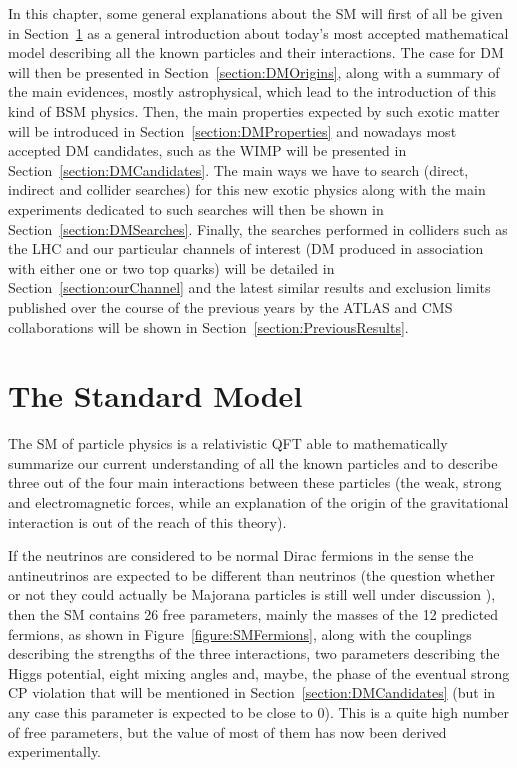 \documentclass[a4paper, 10pt, openright]{report}
\begin{document}
In this chapter, some general explanations about the \ac{SM} will first of all be given in Section~\ref{section:SM} as a general introduction about today's most accepted mathematical model describing all the known particles and their interactions. The case for \ac{DM} will then be presented in Section~\ref{section:DMOrigins}, along with a summary of the main evidences, mostly astrophysical, which lead to the introduction of this kind of \acf{BSM} physics. Then, the main properties expected by such exotic matter will be introduced in Section~\ref{section:DMProperties} and nowadays most accepted \ac{DM} candidates, such as the \acf{WIMP} will be presented in Section~\ref{section:DMCandidates}. The main ways we have to search (direct, indirect and collider searches) for this new exotic physics along with the main experiments dedicated to such searches will then be shown in Section~\ref{section:DMSearches}. Finally, the searches performed in colliders such as the \ac{LHC} and our particular channels of interest (\ac{DM} produced in association with either one or two top quarks) will be detailed in Section~\ref{section:ourChannel} and the latest similar results and exclusion limits published over the course of the previous years by the \ac{ATLAS} and \ac{CMS} collaborations will be shown in Section~\ref{section:PreviousResults}.

\section{The Standard Model} \label{section:SM}

The \ac{SM} of particle physics is a relativistic \ac{QFT} able to  mathematically summarize our current understanding of all the known particles and to describe three out of the four main interactions between these particles (the weak, strong and electromagnetic forces, while an explanation of the origin of the gravitational interaction is out of the reach of this theory). 

If the neutrinos are considered to be normal Dirac fermions in the sense the antineutrinos are expected to be different than neutrinos (the question whether or not they could actually be Majorana particles is still well under discussion \cite{Majorana}), then the \ac{SM} contains 26 free parameters, mainly the masses of the 12 predicted fermions, as shown in Figure~\ref{figure:SMFermions}, along with the couplings describing the strengths of the three interactions, two parameters describing the Higgs potential, eight mixing angles and, maybe, the phase of the eventual strong CP violation that will be mentioned in Section~\ref{section:DMCandidates} (but in any case this parameter is expected to be close to 0). This is a quite high number of free parameters, but the value of most of them has now been derived experimentally.
\end{document}
